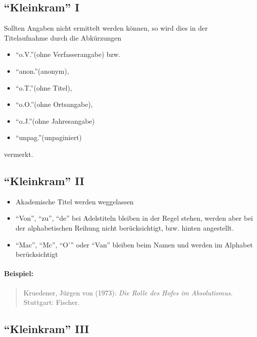 \documentclass[ 12pt,
                titlepage,
                parskip=half,
                version=first,
                bibliography=totocnumbered,
                final,
                listof=totoc]{scrartcl}
\begin{document}
\subsection{\enquote{Kleinkram} I}
\label{sec:sub_kleinkram_1}

Sollten Angaben nicht ermittelt werden können, so wird dies in der Titelaufnahme
durch die Abkürzungen
\begin{itemize}
    \item[] \enquote{o.V.}(ohne Verfasserangabe) bzw.
    \item[] \enquote{anon.}(anonym),
    \item[] \enquote{o.T.}(ohne Titel),
    \item[] \enquote{o.O.}(ohne Ortsangabe),
    \item[] \enquote{o.J.}(ohne Jahresangabe)
    \item[] \enquote{unpag.}(unpaginiert)
\end{itemize}
vermerkt.

\subsection{\enquote{Kleinkram} II}
\label{sec:sub_kleinkram_2}

\begin{itemize}
    \item Akademische Titel werden weggelassen
    \item \enquote{Von}, \enquote{zu}, \enquote{de} bei Adelstiteln bleiben in
    der Regel stehen, werden aber bei der alphabetischen Reihung nicht
    berücksichtigt, bzw. hinten angestellt.
    \item \enquote{Mac}, \enquote{Mc}, \enquote{O'} oder \enquote{Van} bleiben
    beim Namen und werden im Alphabet berücksichtigt
\end{itemize}

\paragraph{Beispiel:}
\begin{quote}
Kruedener, Jürgen von (1973): \emph{Die Rolle des Hofes im Absolutismus.}
Stuttgart: Fischer.
\end{quote}

\subsection{\enquote{Kleinkram} III}
\label{sec:sub_kleinkram_3}
\end{document}
